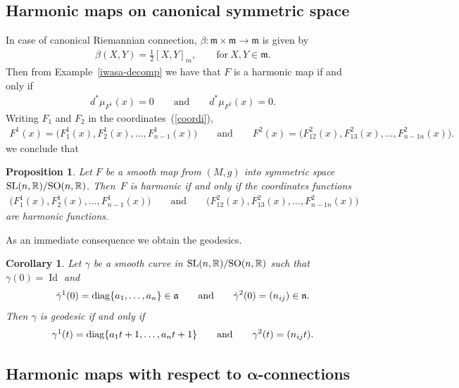 \documentclass[10pt,a4paper]{amsart}
\numberwithin{equation}{section}
\newtheorem{Corollary}[Theorem]{Corollary}
\newtheorem{Proposition}[Theorem]{Proposition}
{ \theoremstyle{definition}
\newtheorem{Definition}[Theorem]{Definition}
\newtheorem{Example}[Theorem]{Example}
\newtheorem{Remark}[Theorem]{Remark}}
\newcommand{\m}{\mathfrak{m}}
\begin{document}
\subsection{Harmonic maps on canonical symmetric space}
In case of canonical Riemannian connection, $\beta\colon  \m \times \m \rightarrow \m$ is given by
\begin{gather*}%
  \beta(X,Y) = \frac{1}{2}[X,Y]_m ,\qquad \textrm{for} \  X,Y \in \m.
\end{gather*}
Then from Example~\ref{iwasa-decomp} we have that $F$ is a harmonic map if and only if
\begin{gather*}
  d^*\mu_{F^1}(x) = 0\qquad  \textrm{and}\qquad d^*\mu_{F^2}(x)=0.
\end{gather*}
Writing $F_1$ and $F_2$ in the coordinates~(\ref{coordi}),
\begin{gather*}
  F^1(x)   =   \big(F^1_1(x),F^1_2(x),\ldots,F^1_{n-1}(x)\big) \qquad \textrm{and} \qquad
  F^2(x)   =   \big(F^2_{12}(x),F^2_{13}(x), \ldots,F^2_{n-1n}(x)\big).
\end{gather*}
we conclude that
\begin{Proposition}
  Let $F$ be a smooth map from $(M,g)$ into symmetric space ${\rm SL}(n,\mathbb{R})/{\rm SO}(n,\mathbb{R})$. Then~$F$ is harmonic if and only if the coordinates functions
  \begin{gather*}
   \big(F^1_1(x),F^1_2(x),\ldots,F^1_{n-1}(x)\big) \qquad \textrm{and} \qquad \big(F^2_{12}(x),F^2_{13}(x), \ldots,F^2_{n-1n}(x)\big)
  \end{gather*}
  are harmonic functions.
\end{Proposition}

As an immediate consequence we obtain the geodesics.
\begin{Corollary}
  Let $\gamma$ be a smooth curve in ${\rm SL}(n,\mathbb{R})/{\rm SO}(n,\mathbb{R})$ such that $\gamma(0) = \operatorname{Id}$ and
  \begin{gather*}
   \dot{\gamma}^1(0) ={\rm diag}\{a_1, \ldots, a_n\} \in \mathfrak{a} \qquad \mbox{and} \qquad \dot{\gamma}^2(0) = (n_{ij}) \in \mathfrak{n}.
  \end{gather*}
  Then $\gamma$ is geodesic if and only if
  \begin{gather*}
   \gamma^1(t) ={\rm diag}\{a_1t +1, \ldots, a_nt +1\} \qquad \mbox{and} \qquad \gamma^2(t)= (n_{ij}t).
  \end{gather*}
\end{Corollary}


\subsection[Harmonic maps with respect to $\alpha$-connections]{Harmonic maps with respect to $\boldsymbol{\alpha}$-connections}
\end{document}
